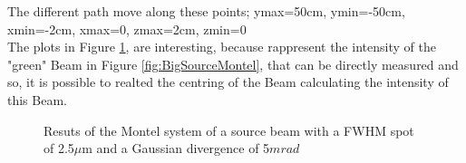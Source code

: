 The different path move along these points; ymax=50cm, ymin=-50cm, xmin=-2cm, xmax=0, zmax=2cm, zmin=0
\\
The plots in Figure \ref{fig: 2nd reuslt diff. path}, are interesting, because rappresent the intensity of the "green" Beam in Figure \ref{fig:BigSourceMontel}, that can be directly measured and so, it is possible to realted the centring of the Beam calculating the intensity of this Beam.
%
\begin{figure}[]
%
\centering
%
%
\quad
%
%
\caption{Resuts of the Montel system of a source beam with a FWHM spot of 2.5$\mu $m and a Gaussian divergence of 5$mrad $}
%
\label{fig: 2nd reuslt diff. path}
%
\end{figure}